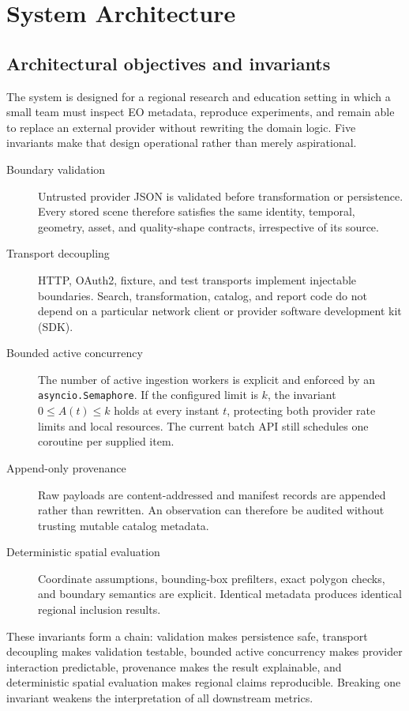 \chapter{System Architecture}

\section{Architectural objectives and invariants}

The system is designed for a regional research and education setting in which a small team must
inspect EO metadata, reproduce experiments, and remain able to replace an external provider
without rewriting the domain logic. Five invariants make that design operational rather than
merely aspirational.

\begin{description}
\item[Boundary validation] Untrusted provider JSON is validated before transformation or
persistence. Every stored scene therefore satisfies the same identity, temporal, geometry, asset,
and quality-shape contracts, irrespective of its source.
\item[Transport decoupling] HTTP, OAuth2, fixture, and test transports implement injectable
boundaries. Search, transformation, catalog, and report code do not depend on a particular
network client or provider software development kit (SDK).
\item[Bounded active concurrency] The number of active ingestion workers is explicit and enforced by an
\texttt{asyncio.Semaphore}. If the configured limit is \(k\), the invariant
\(0\leq A(t)\leq k\) holds at every instant \(t\), protecting both provider rate limits and local
resources. The current batch API still schedules one coroutine per supplied item.
\item[Append-only provenance] Raw payloads are content-addressed and manifest records are appended
rather than rewritten. An observation can therefore be audited without trusting mutable catalog
metadata.
\item[Deterministic spatial evaluation] Coordinate assumptions, bounding-box prefilters, exact
polygon checks, and boundary semantics are explicit. Identical metadata produces identical
regional inclusion results.
\end{description}

These invariants form a chain: validation makes persistence safe, transport decoupling makes
validation testable, bounded active concurrency makes provider interaction predictable, provenance makes
the result explainable, and deterministic spatial evaluation makes regional claims reproducible.
Breaking one invariant weakens the interpretation of all downstream metrics.

